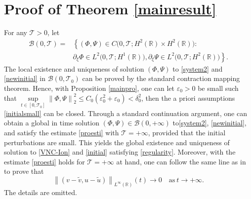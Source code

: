 \documentclass[12pt,reqno]{amsart}
\numberwithin{equation}{section}
\newcommand{\norm}[1]{\left\lVert #1 \right\rVert}
\def\p{\partial}
\def\R{\mathbb{R}}
\def\T{\mathcal{T}}
\newtheorem{theorem}{Theorem}[section]
\begin{document}
\section{Proof of Theorem \ref{mainresult}}\label{section4}
For any $\T>0$, let
\begin{align*}
	\mathcal{B}(0,\T)=&\left\{(\Phi,\Psi) \in C\Big(0,\T;H^2(\R) \times H^2(\R)\Big):\right.\\
	&\left.\p_{\xi}\Phi\in L^2\Big(0,\T;H^1(\R)\Big),\p_{\xi}\Psi \in L^2\Big(0,\T;H^2(\R)\Big)\right\}.
\end{align*}
The local existence and uniqueness of solution $(\Phi,\Psi)$ to \eqref{system2} and \eqref{newinitial} in  $\mathcal{B} (0,\T_0)$ can be proved by the standard contraction mapping theorem. Hence, with
Proposition \ref{mainpro}, one can let $\varepsilon_0>0$ be small such that $\mathop{sup}\limits_{t \in [0,\T_0]}\norm{\Phi,\Psi}^2_2 \leq C_0(\varepsilon^2_0+\varepsilon_0)<\delta^2_0$,
then the a priori assumptions \eqref{initialsmall} can be closed. Through a standard continuation
argument, one can obtain a global in time solution $(\Phi,\Psi) \in \mathcal{B}(0,+\infty)$ to\eqref{system2}, \eqref{newinitial}, and satisfy the estimate \eqref{proesti} with $\T=+\infty$, provided that the initial perturbations are small. This yields the global existence and uniqueness of solution to \eqref{VNC-Ion} and \eqref{initial} satisfying \eqref{regularity}. Moreover, with the estimate \eqref{proesti} holds for $\T=+\infty$ at hand, one can follow the same line as
in \cite{zero-mass} to prove that 	
\begin{equation}\label{far1}
	\norm{(v-\tilde{v},u-\tilde{u})}_{L^{\infty}(\R)}(t) \to 0\quad \text{as}~t \to +\infty.
\end{equation} 
The details
are omitted. 
\end{document}
